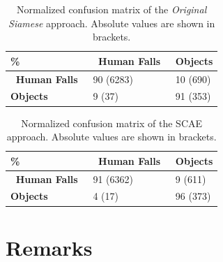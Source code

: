 \begin{table}[t]
	\caption{Normalized confusion matrix of the \textit{Original Siamese} approach. Absolute values are shown in brackets.}
	\label{tab:cm_prai}
	\begin{center}
		\begin{tabular}[t]{C{3cm}|C{3cm}|C{3cm}}	
			
			\hline
			\textbf{\%} & \textbf{$\,$ Human Falls $\,$ } & \textbf{Objects} \\ %
			\hline
			\textbf{$\,$ Human Falls $\,$ }     			& 90 (6283)    &  10 (690)     \\
			\textbf{Objects} 								& 9 (37)   &   91 (353)     	\\
			\hline
		\end{tabular}
	\end{center}
\end{table}
\begin{table}[t]
	\caption{Normalized confusion matrix of the SCAE approach. Absolute values are shown in brackets.}
	\label{tab:cm_scae}
	\begin{center}
		
		\begin{tabular}[t]{C{3cm}|C{3cm}|C{3cm}}
			\hline
			\textbf{\%}                                                    & \textbf{$\,$ Human Falls $\,$ } & \textbf{Objects} \\
			
			\hline
			\textbf{$\,$ Human Falls $\,$ } & 91 (6362)                       & 9 (611)          \\
			\textbf{Objects}                                               & 4 (17)                          & 96 (373)         \\ \hline
		\end{tabular}
	\end{center}
\end{table}

\section{Remarks}

